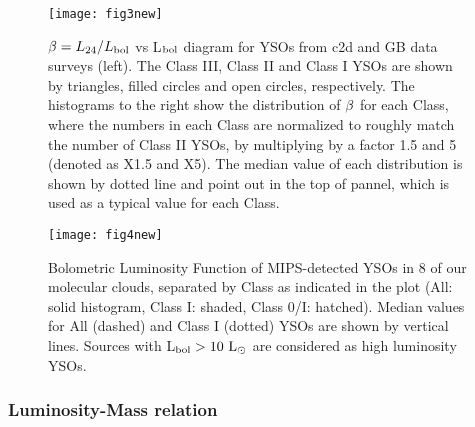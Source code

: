 \documentclass[iop]{emulateapj}
\begin{document}

\begin{figure}
\centering
\texttt{[image: fig3new]}
\caption{
$\beta=L_{24}/L_{\rm bol}$ vs L$_{\rm bol}$ diagram for YSOs from c2d and GB data 
surveys (left). The Class III, Class II and Class I YSOs are shown by triangles, filled circles 
and open circles, respectively. The histograms to the right show the
distribution of ${\rm \beta}$ for each Class, where the numbers in each Class 
are normalized to roughly match the number of Class II YSOs, by multiplying
by a factor 1.5 and 5 (denoted as X1.5 and X5). The median value of each distribution is
shown by dotted line and point out in the top of pannel, which is used as a typical value 
for each Class.
}
\label{figure3}
\end{figure}

\begin{figure}[ht!]
     \begin{center}
\texttt{[image: fig4new]}
    \end{center}
    \caption{
Bolometric Luminosity Function of MIPS-detected YSOs in 8 of our 
molecular clouds, separated by Class as indicated in the plot 
(All: solid histogram, Class I: shaded, Class 0/I: hatched).
Median values for All (dashed) and Class I (dotted) YSOs are shown 
by vertical lines. Sources with L$_{\rm bol}>10~{\rm L}_{\odot}$
are considered as high luminosity YSOs.
}
\label{figure4}
\end{figure}

\subsubsection{Luminosity-Mass relation}
\end{document}
